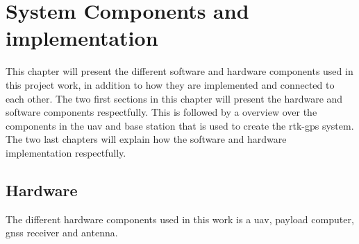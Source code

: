 
\chapter{System Components and implementation}
This chapter will present the different software and hardware components used in this project work, in addition to how they are implemented and connected to each other. The two first sections in this chapter will present the hardware and software components respectfully. This is followed by a overview over the components in the \gls{uav} and base station that is used to create the \gls{rtk-gps} system. The two last chapters will explain how the software and hardware implementation respectfully.
\section{Hardware}
The different hardware components used in this work is a \gls{uav}, payload computer, \gls{gnss} receiver and antenna.

